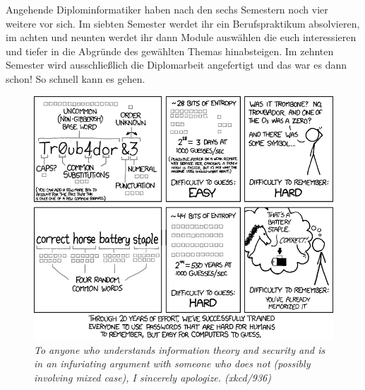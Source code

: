 \hline

Angehende Diplominformatiker haben nach den sechs Semestern noch vier weitere vor sich.
Im siebten Semester werdet ihr ein Berufspraktikum absolvieren, im achten und neunten werdet ihr dann Module auswählen die euch interessieren und tiefer in die Abgründe des gewählten Themas hinabsteigen.
Im zehnten Semester wird ausschließlich die Diplomarbeit angefertigt und das war es dann schon!
So schnell kann es gehen.

\begin{figure}[h!]
\centering \includegraphics[width=\linewidth]{img/xkcd/password_strength.png}
\caption*{{\small \textit{To anyone who understands information theory and security and is in an infuriating argument with someone who does not (possibly involving mixed case), I sincerely apologize. (xkcd/936)}}}
\end{figure}
